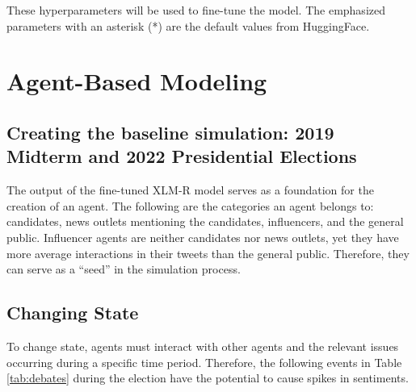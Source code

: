 These hyperparameters will be used to fine-tune the model. The emphasized parameters with an asterisk (*) are the default values from HuggingFace.

\section{Agent-Based Modeling}
\subsection{Creating the baseline simulation: 2019 Midterm and 2022 Presidential Elections}
The output of the fine-tuned XLM-R model serves as a foundation for the creation of an agent. The following are the categories an agent belongs to: candidates, news outlets mentioning the candidates, influencers, and the general public. Influencer agents are neither candidates nor news outlets, yet they have more average interactions in their tweets than the general public. Therefore, they can serve as a “seed” in the simulation process.

\subsection{Changing State}
To change state, agents must interact with other agents and the relevant issues occurring during a specific time period.  Therefore, the following events in Table \ref{tab:debates} during the election have the potential to cause spikes in sentiments.

\clearpage

